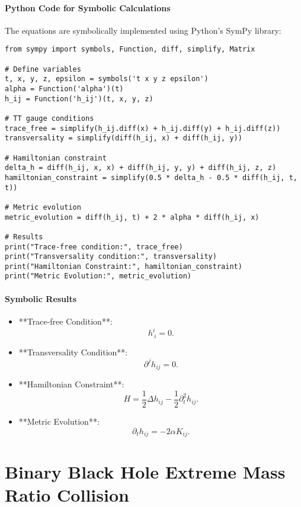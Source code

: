 \documentclass[12pt]{article}
\begin{document}
\paragraph{Python Code for Symbolic Calculations}
The equations are symbolically implemented using Python's SymPy library:
\begin{verbatim}
from sympy import symbols, Function, diff, simplify, Matrix

# Define variables
t, x, y, z, epsilon = symbols('t x y z epsilon')
alpha = Function('alpha')(t)
h_ij = Function('h_ij')(t, x, y, z)

# TT gauge conditions
trace_free = simplify(h_ij.diff(x) + h_ij.diff(y) + h_ij.diff(z))
transversality = simplify(diff(h_ij, x) + diff(h_ij, y))

# Hamiltonian constraint
delta_h = diff(h_ij, x, x) + diff(h_ij, y, y) + diff(h_ij, z, z)
hamiltonian_constraint = simplify(0.5 * delta_h - 0.5 * diff(h_ij, t, t))

# Metric evolution
metric_evolution = diff(h_ij, t) + 2 * alpha * diff(h_ij, x)

# Results
print("Trace-free condition:", trace_free)
print("Transversality condition:", transversality)
print("Hamiltonian Constraint:", hamiltonian_constraint)
print("Metric Evolution:", metric_evolution)
\end{verbatim}

\paragraph{Symbolic Results}
\begin{itemize}
    \item **Trace-free Condition**:
    \[
    h^i_{\ i} = 0.
    \]
    \item **Transversality Condition**:
    \[
    \partial^j h_{ij} = 0.
    \]
    \item **Hamiltonian Constraint**:
    \[
    H = \frac{1}{2} \Delta h_{ij} - \frac{1}{2} \partial_t^2 h_{ij}.
    \]
    \item **Metric Evolution**:
    \[
    \partial_t h_{ij} = -2\alpha K_{ij}.
    \]
\end{itemize}


\section{Binary Black Hole Extreme Mass Ratio Collision}
\end{document}

